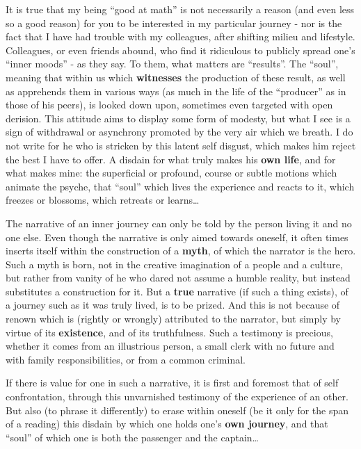 It is true that my being ``good at math'' is not necessarily a reason (and even less so a
good reason) for you to be interested in my particular
journey - nor is the fact that I have had trouble with my colleagues, after shifting
milieu and lifestyle.
Colleagues, or even friends abound, who find it ridiculous to publicly spread 
one's ``inner moods'' - as they say.
To them, what matters are ``results''. 
The ``soul'', meaning that within us which
\textbf{witnesses} the production of these result, 
as well as apprehends them in various ways
(as much in the life of the ``producer'' as in those of his peers), is looked down upon,
sometimes even targeted with open derision.
This attitude aims to display some form of modesty, but what I see is
a sign of withdrawal or asynchrony promoted by the very air which we breath.
I do not write for he who is stricken by this latent self disgust, which makes him reject
the best I have to offer. A disdain 
for what truly makes his \textbf{own life}, and for what makes mine: the superficial or
profound, course or subtle motions which animate the psyche, that ``soul'' which lives the
experience and reacts to it, which freezes or blossoms, which retreats or learns\ldots

The narrative of an inner journey can only be told 
by the person living it and no one else. 
Even though the narrative is only aimed
towards oneself, it often times inserts itself 
within the construction of a \textbf{myth}, of which the narrator is the hero. 
Such a myth is born, not in the creative imagination of a people and a culture, but rather
from vanity of he who dared not assume a humble reality, 
but instead substitutes a construction for it. 
But a \textbf{true} narrative (if such a thing exists), of a journey such as it was truly
lived, is to be prized. And this is not because of renown
which is (rightly or wrongly) attributed to the narrator, but simply by virtue of its
\textbf{existence}, and of its truthfulness. Such a testimony is precious,
whether it comes from an illustrious person, a small clerk with no future 
and with family responsibilities, or from a common criminal.

If there is value for one in such a narrative, it is first and foremost that of self
confrontation, through this unvarnished testimony of the experience 
of an other. 
But also (to phrase it differently) to erase within oneself
(be it only for the span of a reading) this disdain by which one holds one's \textbf{own
journey}, and that ``soul'' of which one is both the passenger and the captain\ldots


